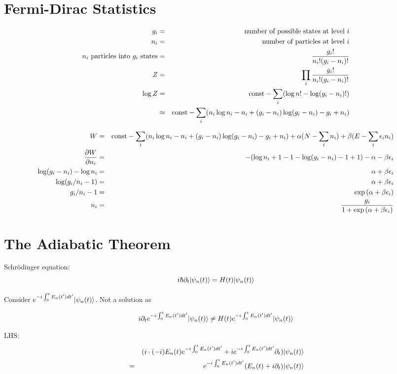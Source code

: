 \documentclass[12pt]{article}
\begin{document}
\section{Fermi-Dirac Statistics}
\begin{eqnarray}g_i &=& \mbox{number of possible states at level } i\\
n_i &=& \mbox{number of particles at level } i\\
n_i\mbox{ particles into }g_i\mbox{ states} &=& {g_i! \over n_i!(g_i-n_i)!}\\
Z &=& \prod_i{g_i! \over n_i!(g_i-n_i)!}\\
\log Z &=& \mbox{const}-\sum_i(\log{n!}-\log(g_i-n_i)!)\\
&\approx& \mbox{const}-\sum_i(n_i\log n_i-n_i+(g_i-n_i)\log(g_i-n_i)-g_i+n_i)\\
\end{eqnarray}

\begin{eqnarray}
W &=& \mbox{const}-\sum_i(n_i\log n_i-n_i+(g_i-n_i)\log(g_i-n_i)-g_i+n_i)+\alpha(N-\sum_in_i)+\beta(E-\sum_i\epsilon_in_i) \\
{\partial W\over\partial n_i} &=& -(\log n_i+1-1-\log(g_i-n_i)-1+1)-\alpha-\beta\epsilon_i \\
\log(g_i-n_i)-\log n_i &=& \alpha+\beta\epsilon_i \\
\log(g_i/n_i-1) &=& \alpha+\beta\epsilon_i \\
g_i/n_i-1 &=& \exp{(\alpha+\beta\epsilon_i)} \\
n_i &=& {g_i\over1+\exp{(\alpha+\beta\epsilon_i)}} \\
\end{eqnarray}

\section{The Adiabatic Theorem}
Schr\"odinger equation:
\begin{equation}
\label{eq:schrod}
i\hbar\partial_t|\psi_n(t)\rangle=H(t)|\psi_n(t)\rangle
\end{equation}

Consider $e^{-i\int_0^tE_n(t')dt'}|\psi_n(t)\rangle$. Not a solution as

\[
i\partial_te^{-i\int_0^tE_n(t')dt'}|\psi_n(t)\rangle \ne H(t)e^{-i\int_0^tE_n(t')dt'}|\psi_n(t)\rangle
\]

LHS:
\begin{eqnarray*}
& & (i\cdot(-i)E_n(t)e^{-i\int_0^tE_n(t')dt'}+ie^{-i\int_0^tE_n(t')dt'}\partial_t)|\psi_n(t)\rangle \\
& = & e^{-i\int_0^tE_n(t')dt'}(E_n(t)+i\partial_t)|\psi_n(t)\rangle
\end{eqnarray*}
\end{document}

